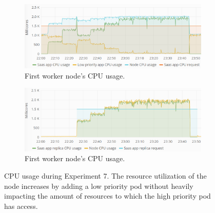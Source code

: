 %
%
\begin{figure}
\centering
\begin{subfigure}[b]{0.9\columnwidth}
\centering
\includegraphics[width=0.75\columnwidth]{Images/Experiments/CPU/Grafana/cpu-saas-lpp-hpa-li-1.PNG}
\caption{First worker node's CPU usage.}
\label{fig:cpu-saas-lpp-hpa-li-1}
\end{subfigure}
\hfill
\begin{subfigure}[b]{0.9\columnwidth}
\centering
\includegraphics[width=0.75\columnwidth]{Images/Experiments/CPU/Grafana/cpu-saas-lpp-hpa-li-2.PNG}
\caption{First worker node's CPU usage.}
\label{fig:cpu-saas-lpp-hpa-li-2}
\end{subfigure}
\hfill
\caption{CPU usage during Experiment 7. The resource utilization of the node increases by adding a low priority pod without heavily impacting the amount of resources to which the high priority pod has access.}
\label{fig:cpu-saas-lpp-hpa-li}
\end{figure}
